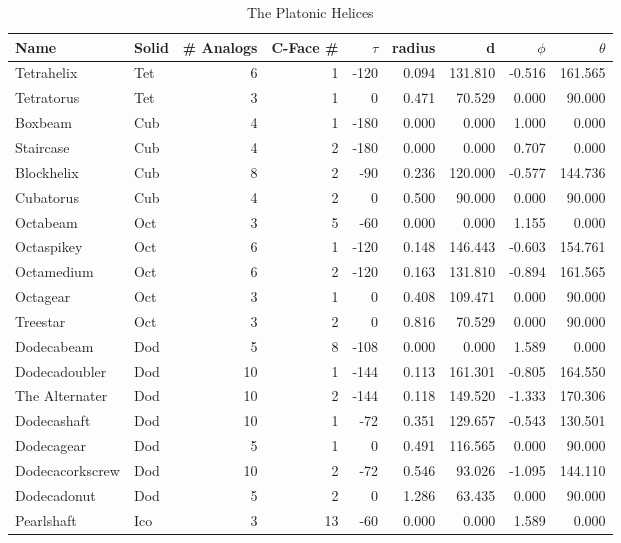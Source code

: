 \documentclass[11pt]{article}
\begin{document}
{\begin{table}[ht]
\caption{The Platonic Helices} %
\centering %
\begin{tabular}{l l r r r r r r r}
  \hline\hline %
  Name & Solid & \# Analogs & C-Face \# & $ \tau $ & radius & d & $ \phi $ & $ \theta $	\\ [0.5ex] %
  \hline %
Tetrahelix & Tet &	6 &	1 &	-120 &	0.094 &	131.810	& -0.516 & 161.565 \\
Tetratorus & Tet & 	3 &	1 &	0    &	0.471 &	70.529	& 0.000	& 90.000 \\
\hline %
Boxbeam & Cub &	4 &	1 &	-180 &	0.000 &	0.000 &	1.000 &	0.000 \\
Staircase & Cub &	4 & 	2 &	-180 &	0.000 &	0.000 &	0.707 &	0.000 \\
Blockhelix & Cub & 	8 & 	2 & 	-90  &	0.236 &	120.000 & -0.577 & 144.736 \\
Cubatorus & Cub &	4 &	2 &	0 &	0.500 &	90.000 & 0.000 & 90.000 \\
\hline %
Octabeam & Oct &	3 &	5 &	-60 &	0.000 &	0.000 &	1.155 &	0.000 \\
Octaspikey & Oct &	6 &	1 &	-120 &	0.148 &	146.443 & -0.603 & 154.761 \\
Octamedium & Oct &	6 &	2 &	-120 &	0.163 &	131.810 & -0.894 & 161.565 \\
Octagear & Oct &	3 &	1 &	0 &	0.408 &	109.471 & 0.000	& 90.000 \\
Treestar & Oct &	3 &	2 &	0 &	0.816 &	70.529 & 0.000 & 90.000 \\
\hline %
Dodecabeam & Dod &	5 &	8 &	-108 &	0.000 &	0.000 &	1.589 &	0.000 \\
Dodecadoubler & Dod &	10 &	1 &	-144 &	0.113 &	161.301 &-0.805 & 164.550 \\
The Alternater & Dod &	10 &	2 &	-144 &	0.118 &	149.520 &-1.333	& 170.306 \\
Dodecashaft & Dod &	10 &	1 &	-72 &	0.351 &	129.657	&-0.543 & 130.501 \\
Dodecagear & Dod &	5 &	1 &	0 &	0.491 &	116.565	& 0.000	& 90.000 \\
Dodecacorkscrew & Dod &	10 &	2 &	-72 &	0.546 &	93.026 & -1.095 & 144.110 \\
Dodecadonut & Dod &	5 &	2 &	0 &	1.286 &	63.435 & 0.000 & 90.000 \\
\hline %
Pearlshaft & Ico &	3 &	13 &	-60 &	0.000 &	0.000 &	1.589 & 0.000 \\

\end{tabular}
\end{table}}
\end{document}
